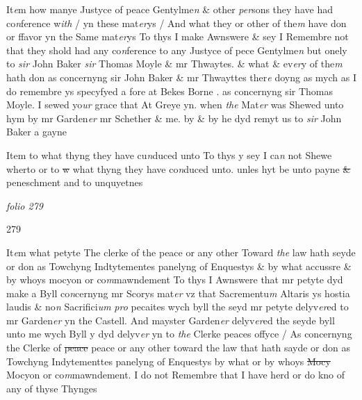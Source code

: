 \documentclass[12pt, a4paper]{book}
\begin{document}
				\marginpar[\vspace{0.5cm}{\textcolor{Gray}{8}}]{}
			

		\ifthenelse{\isodd{\thepage}}
		{\reversemarginpar}
		{\normalmarginpar}
		 It\textit{e}m how manye Justyce of peace Gentylme\textit{n} \& other \textit{per}sons they have had
co\textit{n}ference w\textit{ith} / yn these mat\textit{er}ys / And what they or other of the\textit{m} have don 
or ffavor yn the Same mat\textit{er}ys
To thys I make Awnswere \& sey I Remembre not that they shold had any
co\textit{n}ference to any Justyce of pece Gentylme\textit{n} but onely to \textit{sir} John Baker \textit{sir}
Thomas Moyle \& mr Thwaytes. \& what \& ev\textit{er}y of the\textit{m} hath don as 
concernyng sir John Baker \& mr Thwayttes ther\textit{e} doyng as mych as I do
remembre ys specyfyed a fore at Bekes Borne
			. as concernyng sir Thomas Moyle. I sewed yo\textit{ur}
grace that At Greye yn. when \textit{the} Mat\textit{er} was Shewed unto hym by mr
Garden\textit{er} mr Schether \& me. by \& by he dyd remyt us to \textit{sir} John Baker 
a gayne
 	
				\marginpar[\vspace{0.5cm}{\textcolor{Gray}{9}}]{}
			

		\ifthenelse{\isodd{\thepage}}
		{\reversemarginpar}
		{\normalmarginpar}
		 Item to what thyng they have cu\textit{n}duced unto
To thys y sey I ca\textit{n} not Shewe wherto or to \sout{w} what thyng they have
co\textit{n}duced unto. unles hyt be unto payne \sout{\&} peneschment and to 
unquyetnes

\dotfill
						\newpage
{}

\textit{folio 279}


 	\begin{flushright}{\color{Mahogany}279}\end{flushright}

 	
				\marginpar[\vspace{0.5cm}{\textcolor{Gray}{10}}]{}
			

		\ifthenelse{\isodd{\thepage}}
		{\reversemarginpar}
		{\normalmarginpar}
		 It\textit{e}m what petyte The clerke of the peace or any other Toward \textit{the} law
hath seyde or don as Towchyng Indtytementes panelyng of Enquestys \&
by what accussre \& by whoys mocyon or co\textit{m}mawndement
To thys I Awnswere that mr petyte dyd make a Byll co\textit{n}cernyng mr
Scorys mat\textit{er} vz that Sacrementu\textit{m} Altaris ys hostia laudis \& no\textit{n} Sacrifici\textit{um}
               \textit{pro} pecaites wych byll the seyd mr petyte delyv\textit{er}ed to mr Garden\textit{er} yn the
Castell. And mayster Garden\textit{er} delyv\textit{er}ed the seyde byll unto me wych Byll
y dyd delyv\textit{er} yn to \textit{the} Clerke peaces offyce / As concernyng the Clerke of \sout{peace}
peace or any other toward the law that hath sayde or don as Towchyng 
Indytementtes panelyng of Enquestys by what or by whoys \sout{Mocy}
Mocyon or co\textit{m}mawndement. I do not Remembre that I have herd or do
kno of any of thyse Thynges
 	
\end{document}
